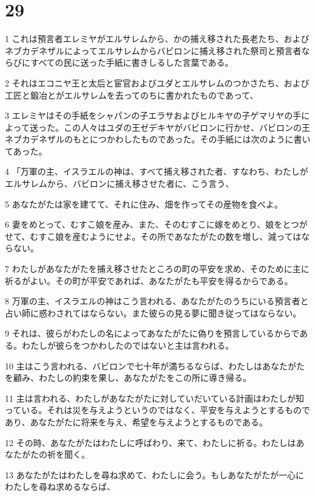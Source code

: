\chapter{29}

\par 1 これは預言者エレミヤがエルサレムから、かの捕え移された長老たち、およびネブカデネザルによってエルサレムからバビロンに捕え移された祭司と預言者ならびにすべての民に送った手紙に書きしるした言葉である。
\par 2 それはエコニヤ王と太后と宦官およびユダとエルサレムのつかさたち、および工匠と鍛冶とがエルサレムを去ってのちに書かれたものであって、
\par 3 エレミヤはその手紙をシャパンの子エラサおよびヒルキヤの子ゲマリヤの手によって送った。この人々はユダの王ゼデキヤがバビロンに行かせ、バビロンの王ネブカデネザルのもとにつかわしたものであった。その手紙には次のように書いてあった。
\par 4 「万軍の主、イスラエルの神は、すべて捕え移された者、すなわち、わたしがエルサレムから、バビロンに捕え移させた者に、こう言う、
\par 5 あなたがたは家を建てて、それに住み、畑を作ってその産物を食べよ。
\par 6 妻をめとって、むすこ娘を産み、また、そのむすこに嫁をめとり、娘をとつがせて、むすこ娘を産むようにせよ。その所であなたがたの数を増し、減ってはならない。
\par 7 わたしがあなたがたを捕え移させたところの町の平安を求め、そのために主に祈るがよい。その町が平安であれば、あなたがたも平安を得るからである。
\par 8 万軍の主、イスラエルの神はこう言われる、あなたがたのうちにいる預言者と占い師に惑わされてはならない。また彼らの見る夢に聞き従ってはならない。
\par 9 それは、彼らがわたしの名によってあなたがたに偽りを預言しているからである。わたしが彼らをつかわしたのではないと主は言われる。
\par 10 主はこう言われる、バビロンで七十年が満ちるならば、わたしはあなたがたを顧み、わたしの約束を果し、あなたがたをこの所に導き帰る。
\par 11 主は言われる、わたしがあなたがたに対していだいている計画はわたしが知っている。それは災を与えようというのではなく、平安を与えようとするものであり、あなたがたに将来を与え、希望を与えようとするものである。
\par 12 その時、あなたがたはわたしに呼ばわり、来て、わたしに祈る。わたしはあなたがたの祈を聞く。
\par 13 あなたがたはわたしを尋ね求めて、わたしに会う。もしあなたがたが一心にわたしを尋ね求めるならば、
